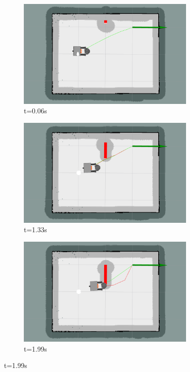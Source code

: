 \begin{figure}[H]
    \centering
    \begin{subfigure}[b]{0.30\linewidth}
        \centering
        \includegraphics[width=0.95\textwidth]{images/eband_2_single_1_obs/1/5006.png} \caption{t=0.06s}
    \end{subfigure}%
    \begin{subfigure}[b]{0.30\linewidth}
        \centering
        \includegraphics[width=0.95\textwidth]{images/eband_2_single_1_obs/1/5133.png} \caption{t=1.33s}
    \end{subfigure}%
    \begin{subfigure}[b]{0.30\linewidth}
        \centering
        \includegraphics[width=0.95\textwidth]{images/eband_2_single_1_obs/1/5199.png} \caption{t=1.99s}

\end{subfigure}
\end{figure}
